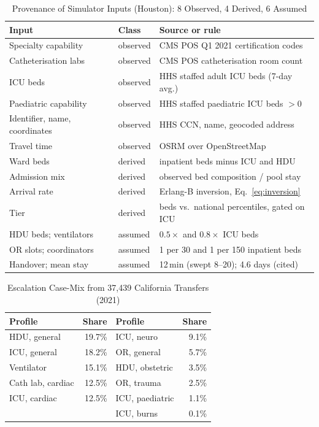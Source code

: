 \begin{table}[!t]
\centering
\caption{Provenance of Simulator Inputs (Houston): 8 Observed, 4 Derived, 6 Assumed}
\label{tab:prov}
\scriptsize
\setlength{\tabcolsep}{2.5pt}
\begin{tabular}{@{}p{2.2cm}p{1.0cm}p{4.3cm}@{}}
\toprule
Input & Class & Source or rule \\
\midrule
Specialty capability & observed & CMS POS Q1 2021 certification codes \\
Catheterisation labs & observed & CMS POS catheterisation room count \\
ICU beds & observed & HHS staffed adult ICU beds (7-day avg.) \\
Paediatric capability & observed & HHS staffed paediatric ICU beds $>0$ \\
Identifier, name, coordinates & observed & HHS CCN, name, geocoded address \\
Travel time & observed & OSRM over OpenStreetMap \\
\midrule
Ward beds & derived & inpatient beds minus ICU and HDU \\
Admission mix & derived & observed bed composition / pool stay \\
Arrival rate & derived & Erlang-B inversion, Eq.~\eqref{eq:inversion} \\
Tier & derived & beds vs.\ national percentiles, gated on ICU \\
\midrule
HDU beds; ventilators & assumed & $0.5\times$ and $0.8\times$ ICU beds \\
OR slots; coordinators & assumed & 1 per 30 and 1 per 150 inpatient beds \\
Handover; mean stay & assumed & 12\,min (swept 8--20); 4.6 days (cited) \\
\bottomrule
\end{tabular}
\end{table}

\begin{table}[!t]
\centering
\caption{Escalation Case-Mix from 37,439 California Transfers (2021)}
\label{tab:casemix}
\scriptsize
\begin{tabular}{@{}lr|lr@{}}
\toprule
Profile & Share & Profile & Share \\
\midrule
HDU, general        & 19.7\% & ICU, neuro          & 9.1\% \\
ICU, general        & 18.2\% & OR, general         & 5.7\% \\
Ventilator          & 15.1\% & HDU, obstetric      & 3.5\% \\
Cath lab, cardiac   & 12.5\% & OR, trauma          & 2.5\% \\
ICU, cardiac        & 12.5\% & ICU, paediatric     & 1.1\% \\
                    &        & ICU, burns          & 0.1\% \\
\bottomrule
\end{tabular}
\end{table}

